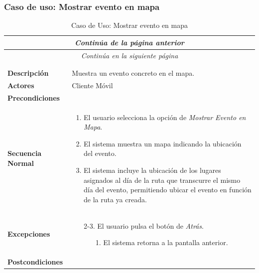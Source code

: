 \subsubsection*{Caso de uso: Mostrar evento en mapa }
\begin{longtable}{| p{4cm} | p{10cm} |}
\endfirsthead
\multicolumn{2}{c}{\textit{Continúa de la página anterior}}\\[12pt]
\hline
\endhead
\hline
\multicolumn{2}{c}{\textit{Continúa en la siguiente página}} \\
\endfoot
\hline
\caption{Caso de Uso: Mostrar evento en mapa}\label{fig:1}\\
\endlastfoot


\hline
\multicolumn{2}{|c|}{\textbf{CU$<$11$>$ - Mostrar Evento en Mapa}} \\

\hline
\textbf{Descripción} &
Muestra un evento concreto en el mapa.\\

\hline
\textbf{Actores} &
Cliente Móvil\\

\hline
\textbf{Precondiciones} &
\\

\hline
\textbf{Secuencia Normal} &\mbox{}\par\vspace{-\baselineskip}
\begin{enumerate}[leftmargin=0.7cm, topsep=0.1cm]
\item El usuario selecciona la opción de \textit{Mostrar Evento en Mapa}.
\item El sistema muestra un mapa indicando la ubicación del evento.
\item El sistema incluye la ubicación de los lugares asignados al día de la ruta que transcurre el mismo día del evento, permitiendo ubicar el evento en función de la ruta ya creada.
\end{enumerate}
\\
\hline
\textbf{Excepciones} &\mbox{}\par\vspace{-\baselineskip}
\begin{enumerate}[leftmargin=0.9cm, topsep=0.1cm]
\item[2-3.] El usuario pulsa el botón de \textit{Atrás}.
	\begin{itemize}
	\item[1.] El sistema retorna a la pantalla anterior.
	\end{itemize}
\end{enumerate}
\\

\hline
\textbf{Postcondiciones} & \\
\hline
\end{longtable}



